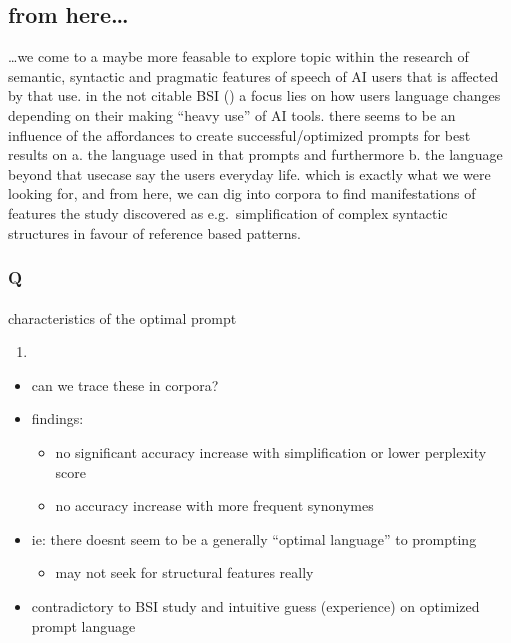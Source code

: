 \documentclass[
  letterpaper,
  DIV=11,
  numbers=noendperiod]{scrartcl}
\makeatletter
\let\oldparagraph\paragraph
\renewcommand{\paragraph}{
    \@ifstar
      \xxxParagraphStar
      \xxxParagraphNoStar
  }
\newcommand{\xxxParagraphStar}[1]{\oldparagraph*{#1}\mbox{}}
\newcommand{\xxxParagraphNoStar}[1]{\oldparagraph{#1}\mbox{}}
\providecommand{\tightlist}{%
  \setlength{\itemsep}{0pt}\setlength{\parskip}{0pt}}
\makeatother
\begin{document}
\subsection{from here\ldots{}}\label{from-here}

\ldots we come to a maybe more feasable to explore topic within the
research of semantic, syntactic and pragmatic features of speech of AI
users that is affected by that use. in the not citable BSI
() a focus lies on how users language
changes depending on their making ``heavy use'' of AI tools. there seems
to be an influence of the affordances to create successful/optimized
prompts for best results on a. the language used in that prompts and
furthermore b. the language beyond that usecase say the users everyday
life. which is exactly what we were looking for, and from here, we can
dig into corpora to find manifestations of features the study discovered
as e.g.~simplification of complex syntactic structures in favour of
reference based patterns.

\subsubsection{Q}\label{q}

\paragraph{characteristics of the optimal
prompt}\label{characteristics-of-the-optimal-prompt}

\begin{enumerate}
\def\labelenumi{(\arabic{enumi})}
\tightlist
\item
\end{enumerate}

\begin{itemize}
\tightlist
\item
  can we trace these in corpora?
\item
  findings:

  \begin{itemize}
  \tightlist
  \item
    no significant accuracy increase with simplification or lower
    perplexity score
  \item
    no accuracy increase with more frequent synonymes
  \end{itemize}
\item
  ie: there doesnt seem to be a generally ``optimal language'' to
  prompting

  \begin{itemize}
  \tightlist
  \item
    may not seek for structural features really
  \end{itemize}
\item
  contradictory to BSI study and intuitive guess (experience) on
  optimized prompt language
\end{itemize}
\end{document}
